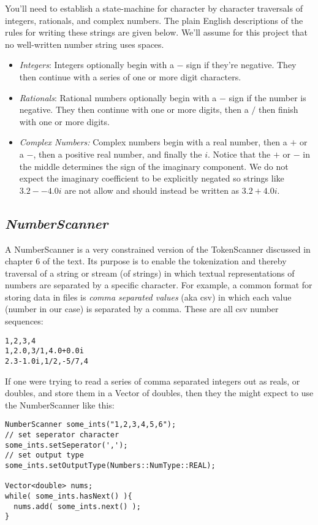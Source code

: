 \documentclass[10pt]{article}
\begin{document}
You'll need to establish a state-machine for character by character traversals of integers, rationals, and complex numbers.  The plain English descriptions of the rules for writing these strings are given below. We'll assume for this project that no well-written number string uses spaces. 
\begin{itemize}
\item \textit{Integers}: Integers optionally begin with a $-$ sign if they're negative. They then continue with a series of one or more digit characters.  
\item \textit{Rationals}: Rational numbers optionally begin with a $-$ sign if the number is negative. They then continue with one or more digits, then a $/$ then finish with one or more digits.  
\item \textit{Complex Numbers:} Complex numbers begin with a real number, then a $+$ or a $-$, then a positive real number, and finally the $i$. Notice that the $+$ or $-$ in the middle determines the sign of the imaginary component. We do not expect the imaginary coefficient to be explicitly negated so strings like $3.2--4.0i$ are not allow and should instead be written as $3.2+4.0i$.
\end{itemize}


\subsection{\textit{NumberScanner}} 

A NumberScanner is a very constrained version of the TokenScanner discussed in chapter 6 of the text. Its purpose is to enable the tokenization and thereby traversal of a string or stream (of strings) in which textual representations of numbers are separated by a specific character. For example, a common format for storing data in files is \textit{comma separated values} (aka csv) in which each value (number in our case) is separated by a comma.  These are all csv number sequences:
\begin{verbatim}
1,2,3,4
1,2.0,3/1,4.0+0.0i
2.3-1.0i,1/2,-5/7,4
\end{verbatim}

If one were trying to read a series of comma separated integers out as reals, or doubles, and store them in a Vector of doubles, then they the might expect to use the NumberScanner like this:
\begin{verbatim}
NumberScanner some_ints("1,2,3,4,5,6");
// set seperator character
some_ints.setSeperator(',');
// set output type
some_ints.setOutputType(Numbers::NumType::REAL);

Vector<double> nums;
while( some_ints.hasNext() ){
  nums.add( some_ints.next() );
}
\end{verbatim}
\end{document}
